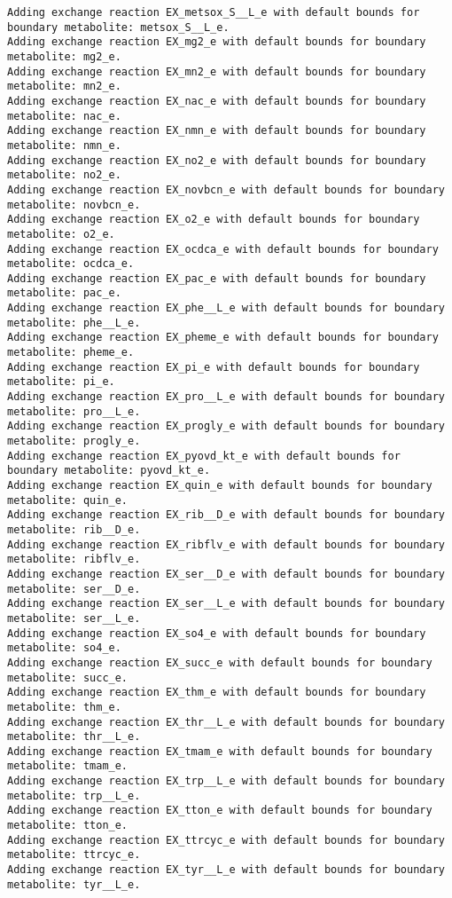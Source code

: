 \documentclass[
  letterpaper,
  DIV=11,
  numbers=noendperiod]{scrartcl}
\begin{document}
\begin{verbatim}
Adding exchange reaction EX_metsox_S__L_e with default bounds for boundary metabolite: metsox_S__L_e.
Adding exchange reaction EX_mg2_e with default bounds for boundary metabolite: mg2_e.
Adding exchange reaction EX_mn2_e with default bounds for boundary metabolite: mn2_e.
Adding exchange reaction EX_nac_e with default bounds for boundary metabolite: nac_e.
Adding exchange reaction EX_nmn_e with default bounds for boundary metabolite: nmn_e.
Adding exchange reaction EX_no2_e with default bounds for boundary metabolite: no2_e.
Adding exchange reaction EX_novbcn_e with default bounds for boundary metabolite: novbcn_e.
Adding exchange reaction EX_o2_e with default bounds for boundary metabolite: o2_e.
Adding exchange reaction EX_ocdca_e with default bounds for boundary metabolite: ocdca_e.
Adding exchange reaction EX_pac_e with default bounds for boundary metabolite: pac_e.
Adding exchange reaction EX_phe__L_e with default bounds for boundary metabolite: phe__L_e.
Adding exchange reaction EX_pheme_e with default bounds for boundary metabolite: pheme_e.
Adding exchange reaction EX_pi_e with default bounds for boundary metabolite: pi_e.
Adding exchange reaction EX_pro__L_e with default bounds for boundary metabolite: pro__L_e.
Adding exchange reaction EX_progly_e with default bounds for boundary metabolite: progly_e.
Adding exchange reaction EX_pyovd_kt_e with default bounds for boundary metabolite: pyovd_kt_e.
Adding exchange reaction EX_quin_e with default bounds for boundary metabolite: quin_e.
Adding exchange reaction EX_rib__D_e with default bounds for boundary metabolite: rib__D_e.
Adding exchange reaction EX_ribflv_e with default bounds for boundary metabolite: ribflv_e.
Adding exchange reaction EX_ser__D_e with default bounds for boundary metabolite: ser__D_e.
Adding exchange reaction EX_ser__L_e with default bounds for boundary metabolite: ser__L_e.
Adding exchange reaction EX_so4_e with default bounds for boundary metabolite: so4_e.
Adding exchange reaction EX_succ_e with default bounds for boundary metabolite: succ_e.
Adding exchange reaction EX_thm_e with default bounds for boundary metabolite: thm_e.
Adding exchange reaction EX_thr__L_e with default bounds for boundary metabolite: thr__L_e.
Adding exchange reaction EX_tmam_e with default bounds for boundary metabolite: tmam_e.
Adding exchange reaction EX_trp__L_e with default bounds for boundary metabolite: trp__L_e.
Adding exchange reaction EX_tton_e with default bounds for boundary metabolite: tton_e.
Adding exchange reaction EX_ttrcyc_e with default bounds for boundary metabolite: ttrcyc_e.
Adding exchange reaction EX_tyr__L_e with default bounds for boundary metabolite: tyr__L_e.

\end{verbatim}
\end{document}
